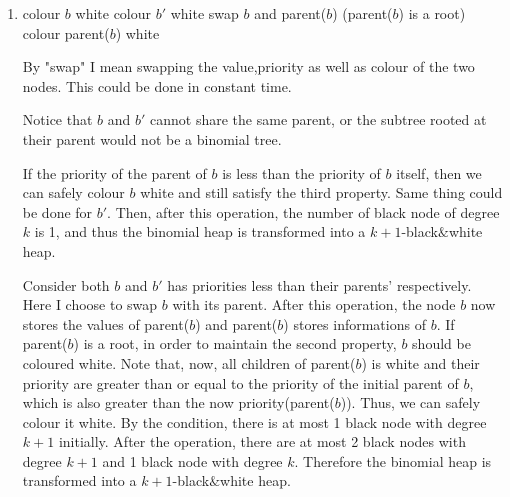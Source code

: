 \documentclass[10pt]{article}
\begin{document}
\begin{enumerate}
	\item
	\begin{comment}
		Suppose you have a linked-list H of binomial trees that satisfies all
		the properties of a black$&$white heap except that it has two black nodes
		$b$ and $b'$ of degree k both of which have parents of degree $k+1$.
		Given pointers to $b$ and $b'$, explain how to transform H in constant
		time into a k'-black$&$white heap with the same set of nodes, for some
		$k' > k$.
	\end{comment}
		
		\begin{algorithmic}[1]
				\State colour $b$ white
				\State colour $b'$ white
			\Else
				\State swap $b$ and parent($b$)
				\If(parent($b$) is a root)
					\State colour parent($b$) white
				\EndIf
			\EndIf
		\end{algorithmic}

		By "swap" I mean swapping the value,priority as well as colour of the
		two nodes. 
		This could be done in constant time.

		Notice that $b$ and $b'$ cannot share the same parent, or the
		subtree rooted at their parent would not be a binomial tree.

		If the priority of the parent of $b$ is less than the priority of $b$
		itself, then we can safely colour $b$ white and still satisfy the
		third property. 
		Same thing could be done for $b'$.
		Then, after this operation, the number of black node of degree $k$ is
		1, and thus the binomial heap is transformed into a $k+1$-black$\&$white
		heap.

		Consider both $b$ and $b'$ has priorities less than their parents'
		respectively.
		Here I choose to swap $b$ with its parent.
		After this operation, the node $b$ now stores the values of parent($b$)
		and parent($b$) stores informations of $b$.
		If parent($b$) is a root, in order to maintain the second property, $b$
		should be coloured white. 
		Note that, now, all children of parent($b$) is white and their priority
		are	greater than or equal to the priority of the initial parent of $b$, 
		which is also greater than the now priority(parent($b$)). 
		Thus, we can safely colour it white.
		By the condition, there is at most 1 black node with degree $k+1$
		initially.
		After the operation, there are at most 2 black nodes with degree $k+1$
		and 1 black node with degree $k$.
		Therefore the binomial heap is transformed into a $k+1$-black$\&$white
		heap.


\end{enumerate}
\end{document}
